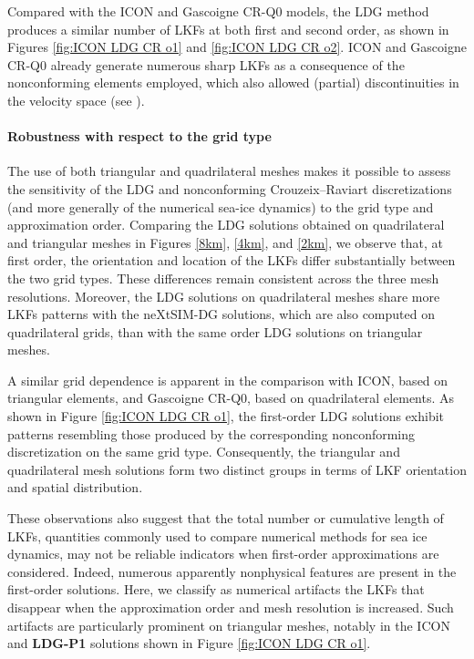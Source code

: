 \documentclass[11pt]{article}
\begin{document}
Compared with the ICON and Gascoigne CR-Q0 models, the LDG method produces a similar number of LKFs at both first and second order, as shown in Figures \ref{fig:ICON LDG CR o1} and \ref{fig:ICON LDG CR o2}. ICON and Gascoigne CR-Q0 already generate numerous sharp LKFs as a consequence of the nonconforming elements employed, which also allowed (partial) discontinuities in the velocity space (see \cite{Mehlmann2021}). 


\paragraph{Robustness with respect to the grid type}
The use of both triangular and quadrilateral meshes makes it possible to assess the sensitivity of the LDG and nonconforming Crouzeix--Raviart discretizations (and more generally of the numerical sea-ice dynamics) to the grid type and approximation order. Comparing the LDG solutions obtained on quadrilateral and triangular meshes in Figures \ref{8km}, \ref{4km}, and \ref{2km}, we observe that, at first order, the orientation and location of the LKFs differ substantially between the two grid types. These differences remain consistent across the three mesh resolutions. Moreover, the LDG solutions on quadrilateral meshes share more LKFs patterns with the neXtSIM-DG solutions, which are also computed on quadrilateral grids, than with the same order LDG solutions on triangular meshes.

A similar grid dependence is apparent in the comparison with ICON, based on triangular elements, and Gascoigne CR-Q0, based on quadrilateral elements. As shown in Figure \ref{fig:ICON LDG CR o1}, the first-order LDG solutions exhibit patterns resembling those produced by the corresponding nonconforming discretization on the same grid type. Consequently, the triangular and quadrilateral mesh solutions form two distinct groups in terms of LKF orientation and spatial distribution.

These observations also suggest that the total number or cumulative length of LKFs, quantities commonly used to compare numerical methods for sea ice dynamics, may not be reliable indicators when first-order approximations are considered. Indeed, numerous apparently nonphysical features are present in the first-order solutions. Here, we classify as numerical artifacts the LKFs that disappear when the approximation order and mesh resolution is increased. Such artifacts are particularly prominent on triangular meshes, notably in the ICON and \textbf{LDG-P1} solutions shown in Figure \ref{fig:ICON LDG CR o1}.
\end{document}
